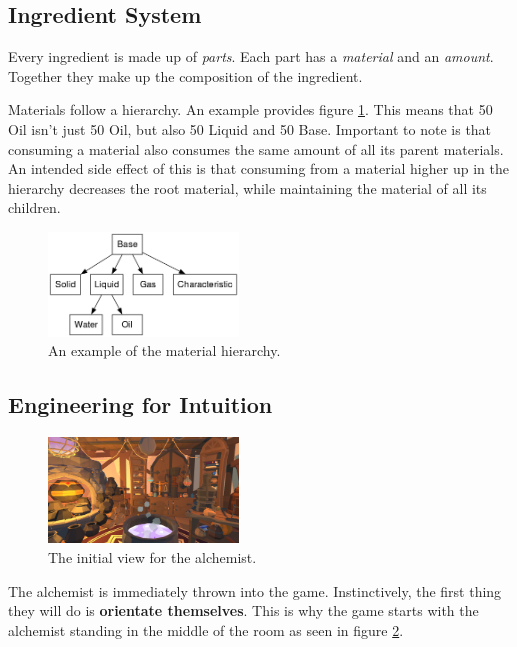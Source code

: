 \documentclass{vgtc}
\begin{document}
\subsection{Ingredient System}

Every ingredient is made up of \emph{parts}. Each part has a \emph{material} and an \emph{amount}. Together they
make up the composition of the ingredient.

Materials follow a hierarchy. An example provides figure \ref{fig:MaterialHierarchyExample}. This means that
50 Oil isn't just 50 Oil, but also 50 Liquid and 50 Base. Important to note is that consuming a material also
consumes the same amount of all its parent materials. An intended side effect of this is that consuming
from a material higher up in the hierarchy decreases the root material, while maintaining the material of all its children.

\begin{figure}[ht]
  \centering
  \includegraphics[width=0.45\textwidth]{pictures/test.png}
  \caption{An example of the material hierarchy.}
  \label{fig:MaterialHierarchyExample}
\end{figure}

\subsection{Engineering for Intuition}

\begin{figure}[ht]
  \centering
  \includegraphics[width=0.45\textwidth]{pictures/Screenshot_1.png}
  \caption{The initial view for the alchemist.}
  \label{fig:InitialView}
\end{figure}

The alchemist is immediately thrown into the game. Instinctively, the first thing they will do is
\textbf{orientate themselves}. This is why the game starts with the alchemist standing in the middle of the room as
seen in figure \ref{fig:InitialView}.
\end{document}
